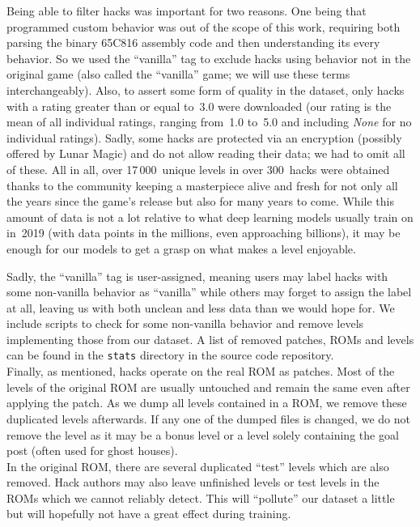 Being able to filter hacks was important for two reasons. One being
that programmed custom behavior was out of the scope of this work,
requiring both parsing the binary 65C816 assembly code and then
understanding its every behavior. So we used the ``vanilla'' tag to
exclude hacks using behavior not in the original game (also called
the ``vanilla'' game; we will use these terms interchangeably). 
Also, to assert some form of quality in the dataset, only hacks with a
rating greater than or equal to~3.0 were downloaded (our rating is the
mean of all individual ratings, ranging from~1.0 to~5.0 and including
\emph{None} for no individual ratings). Sadly, some hacks are
protected via an encryption (possibly offered by Lunar Magic) and do
not allow reading their data; we had to omit all of these. All in all,
over 17\,000~unique levels in over 300~hacks were obtained thanks to
the community keeping a masterpiece alive and fresh for not only all
the years since the game's release but also for many years to come.
While this amount of data is not a lot relative to what deep learning
models usually train on in~2019 (with data points in the millions,
even approaching billions), it may be enough for our models to get a
grasp on what makes a level enjoyable.

Sadly, the ``vanilla'' tag is user-assigned, meaning users may label
hacks with some non-vanilla behavior as ``vanilla'' while others may
forget to assign the label at all, leaving us with both unclean and
less data than we would hope for. We include scripts to check for some
non-vanilla behavior and remove levels implementing those from our
dataset. A list of removed patches, ROMs and levels can be found in
the \texttt{stats} directory in the source code repository. \\
Finally, as mentioned, hacks operate on the real ROM as patches. Most
of the levels of the original ROM are usually untouched and remain the
same even after applying the patch. As we dump all levels contained in
a ROM, we remove these duplicated levels afterwards. If any one of the
dumped files is changed, we do not remove the level as it may be a
bonus level or a level solely containing the goal post (often used for
ghost houses). \\
In the original ROM, there are several duplicated ``test'' levels
which are also removed. Hack authors may also leave unfinished levels
or test levels in the ROMs which we cannot reliably detect. This will
``pollute'' our dataset a little but will hopefully not have a great
effect during training.

